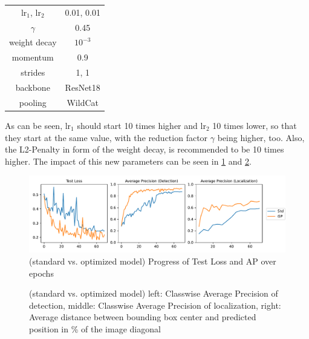 \begin{center}
	\begin{tabular}{ c | c }
		lr$_1$, lr$_2$ & 0.01, 0.01\\  
		$\gamma$ & 0.45\\
		weight decay & $10^{-3}$\\
		\color{gray}momentum & \color{gray}0.9\\
		\color{gray}strides & \color{gray}1, 1\\
		\color{gray}backbone & \color{gray}ResNet18\\
		\color{gray}pooling & \color{gray}WildCat
	\end{tabular}
\end{center}

As can be seen, lr$_1$ should start 10 times higher and lr$_2$ 10 times lower, so that they start at the same value, with the reduction factor $\gamma$ being higher, too. Also, the L2-Penalty in form of the weight decay, is recommended to be 10 times higher. The impact of this new parameters can be seen in \ref{fig:gp_aps} and \ref{fig:gp_distances}.

\begin{figure}[h]
	\centering
	\includegraphics[width=15cm]{4_experiments/images/0_GP_exp/APs.pdf}
	\caption{(standard vs. optimized model) Progress of Test Loss and AP over epochs}
	\label{fig:gp_aps}
\end{figure}

\begin{figure}[h]
	\centering
\caption{(standard vs. optimized model) left: Classwise Average Precision of detection, middle: Classwise Average Precision of localization, right: Average distance between bounding box center and predicted position in \% of the image diagonal}
\label{fig:gp_distances}
\end{figure}

